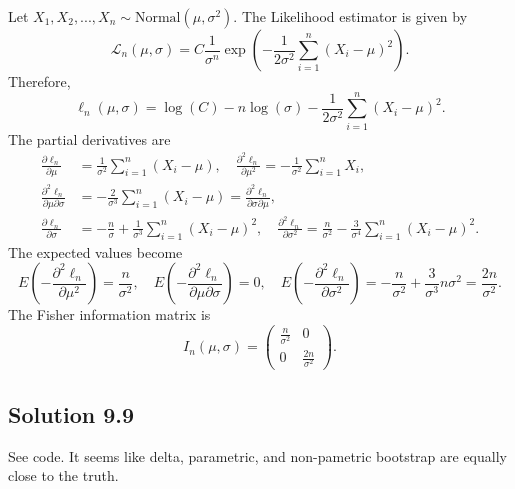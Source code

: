 Let $X_1, X_2, ..., X_n \sim \mathrm{Normal}(\mu, \sigma^2)$.
The Likelihood estimator is given by
\begin{equation*}
    \mathcal{L}_n(\mu, \sigma) = C \frac{1}{\sigma^n} \exp\left(-\frac{1}{2\sigma^2} \sum_{i=1}^n (X_i - \mu)^2\right).
\end{equation*}
Therefore,
\begin{equation*}
    \ell_n(\mu, \sigma) = \log(C) - n\log(\sigma) - \frac{1}{2\sigma^2} \sum_{i = 1}^n (X_i - \mu)^2.
\end{equation*}
The partial derivatives are
\begin{equation*}
    \begin{split}
        \frac{\partial \ell_n}{\partial \mu} &= \frac{1}{\sigma^2} \sum_{i = 1}^n (X_i - \mu), \quad
        \frac{\partial^2 \ell_n}{\partial \mu^2} = -\frac{1}{\sigma^2} \sum_{i = 1}^n X_i, \\
        \frac{\partial^2 \ell_n}{\partial \mu \partial \sigma} &= -\frac{2}{\sigma^3} \sum_{i = 1}^n (X_i - \mu) = \frac{\partial^2 \ell_n}{\partial \sigma \partial \mu}, \\
        \frac{\partial \ell_n}{\partial \sigma} &= -\frac{n}{\sigma} + \frac{1}{\sigma^3} \sum_{i = 1}^n (X_i - \mu)^2, \quad
        \frac{\partial^2 \ell_n}{\partial \sigma^2} = \frac{n}{\sigma^2} - \frac{3}{\sigma^4} \sum_{i = 1}^n (X_i - \mu)^2.
    \end{split}
\end{equation*}
The expected values become
\begin{equation*}
    E\left(-\frac{\partial^2 \ell_n}{\partial \mu^2}\right)
        = \frac{n}{\sigma^2}, \quad
    E\left(-\frac{\partial^2 \ell_n}{\partial \mu \partial \sigma}\right)
        = 0, \quad
    E\left(-\frac{\partial^2 \ell_n}{\partial \sigma^2}\right)
        = -\frac{n}{\sigma^2} + \frac{3}{\sigma^3} n\sigma^2
        = \frac{2n}{\sigma^2}.
\end{equation*}
The Fisher information matrix is
\begin{equation*}
    I_n(\mu, \sigma) = \left( \begin{matrix}
        \frac{n}{\sigma^2} & 0 \\
        0 & \frac{2n}{\sigma^2}
    \end{matrix} \right).
\end{equation*}


\subsection*{Solution 9.9}

See code.
It seems like delta, parametric, and non-pametric bootstrap are equally close to the truth.
